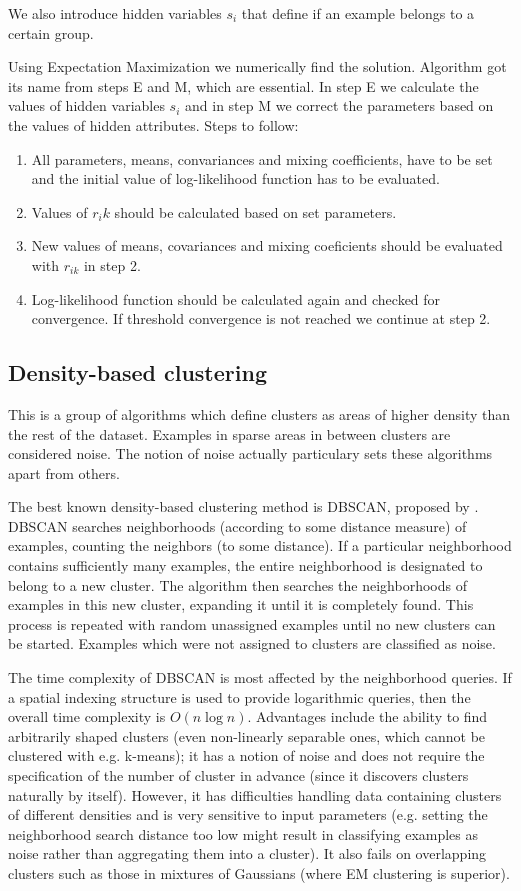 \documentclass[conference]{IEEEtran}
\begin{document}
We also introduce hidden variables $s_i$ that define if an example belongs to a certain group.

Using Expectation Maximization we numerically find the solution. Algorithm got its name from steps E and M,
which are essential. In step E we calculate the values of hidden variables $s_i$ and in step M we correct the parameters based
on the values of hidden attributes. Steps to follow:

\begin{enumerate}
	\item All parameters, means, convariances and mixing coefficients, have to be set and the initial value of log-likelihood
		function has to be evaluated.
	\item Values of $r_ik$ should be calculated based on set parameters.
	\item New values of means, covariances and mixing coeficients should be evaluated with $r_{ik}$ in step 2.
	\item Log-likelihood function should be calculated again and checked for convergence. If threshold convergence
		is not reached we continue at step 2.
\end{enumerate}


\subsection{Density-based clustering}
This is a group of algorithms which define clusters as areas of higher density than the rest
of the dataset. Examples in sparse areas in between clusters are considered noise. The notion
of noise actually particulary sets these algorithms apart from others.

The best known density-based clustering method is DBSCAN, proposed by \cite{ester96}.
DBSCAN searches neighborhoods (according to some distance measure) of examples,
counting the neighbors (to some distance). If a
particular neighborhood contains sufficiently many examples, the entire neighborhood is
designated to belong to a new cluster. The algorithm then searches the neighborhoods of examples
in this new cluster, expanding it until it is completely found.
This process is repeated with random unassigned examples until no new clusters can be started.
Examples which were not assigned to clusters are classified as noise.

The time complexity of DBSCAN is most affected by the neighborhood queries. If a spatial
indexing structure is used to provide logarithmic queries, then the overall time complexity
is $O(n\log n)$. Advantages include the ability to find arbitrarily shaped clusters (even
non-linearly separable ones, which cannot be clustered with e.g. k-means); it has a notion of
noise and does not require the specification of the number of cluster in advance (since it
discovers clusters naturally by itself). However, it has difficulties handling data containing
clusters of different densities and is very sensitive to input parameters (e.g. setting
the neighborhood search distance too low might result in classifying examples as noise
rather than aggregating them into a cluster). It also fails on overlapping clusters such as
those in mixtures of Gaussians (where EM clustering is superior).
\end{document}
